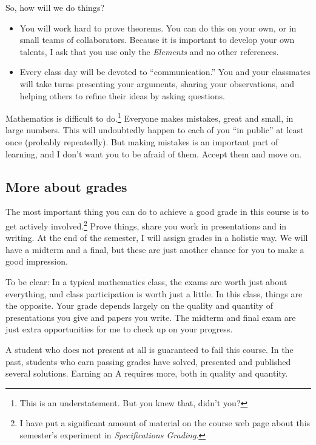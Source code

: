 So, how will we do things?
\begin{itemize}
\item You will work hard to prove theorems.
You can do this on your own, or in small teams of collaborators.
Because it is important to develop your own talents, I ask that you use only the \emph{Elements} and no other references.

\item Every class day will be devoted to ``communication.''
You and your classmates will take turns presenting your arguments, sharing your observations, and helping others to refine their ideas by asking questions.
\end{itemize}



Mathematics is difficult to do.\footnote{This is an understatement. But you knew that, didn't you?}
Everyone makes mistakes, great and small, in large numbers.
This will undoubtedly happen to each of you ``in public'' at least once (probably repeatedly).
But making mistakes is an important part of learning, and I don't want you to be afraid of them.
Accept them and move on.

\subsection*{More about grades}
The most important thing you can do to achieve a good grade in this course is to get actively involved.\footnote{I have put a significant amount of material on the course web page about this semester's experiment in \emph{Specifications Grading}.}
Prove things, share you work in presentations and in writing.
At the end of the semester, I will assign grades in a holistic way.
We will have a midterm and a final, but these are just another chance for you to make a good impression.

To be clear: In a typical mathematics class, the exams are worth just about everything, and class participation is worth just a little.
In this class, things are the opposite.
Your grade depends largely on the quality and quantity of presentations you give and papers you write.
The midterm and final exam are just extra opportunities for me to check up on your progress.

A student who does not present at all is guaranteed to fail this course.
In the past, students who earn passing grades have solved, presented and published several solutions.
Earning an A requires more, both in quality and quantity.

